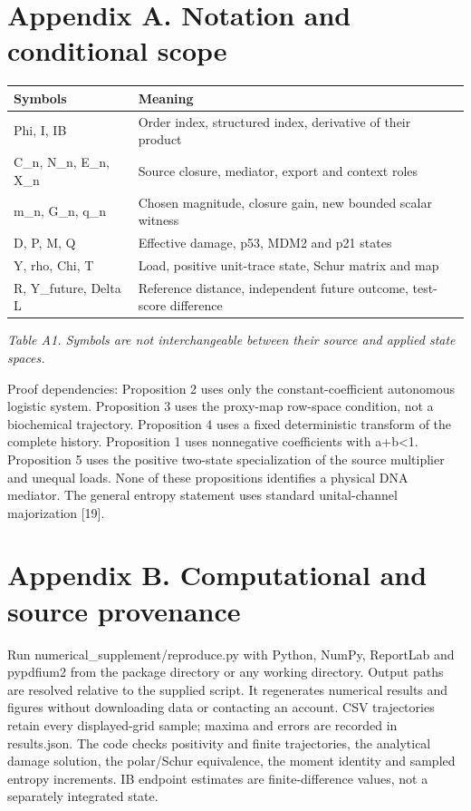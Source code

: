 \documentclass[11pt,a4paper]{article}
\begin{document}
\section*{Appendix A. Notation and conditional scope}
\begin{longtable}{p{7.9cm}|p{7.9cm}}
Symbols & Meaning\\\hline
Phi, I, IB & Order index, structured index, derivative of their product\\\hline
C\_n, N\_n, E\_n, X\_n & Source closure, mediator, export and context roles\\\hline
m\_n, G\_n, q\_n & Chosen magnitude, closure gain, new bounded scalar witness\\\hline
D, P, M, Q & Effective damage, p53, MDM2 and p21 states\\\hline
Y, rho, Chi, T & Load, positive unit-trace state, Schur matrix and map\\\hline
R, Y\_future, Delta L & Reference distance, independent future outcome, test-score difference\\\hline
\end{longtable}{\small\itshape Table A1. Symbols are not interchangeable between their source and applied state spaces.\par}
Proof dependencies: Proposition 2 uses only the constant-coefficient autonomous logistic system. Proposition 3 uses the proxy-map row-space condition, not a biochemical trajectory. Proposition 4 uses a fixed deterministic transform of the complete history. Proposition 1 uses nonnegative coefficients with a+b<1. Proposition 5 uses the positive two-state specialization of the source multiplier and unequal loads. None of these propositions identifies a physical DNA mediator. The general entropy statement uses standard unital-channel majorization [19].

\section*{Appendix B. Computational and source provenance}
Run numerical\_supplement/reproduce.py with Python, NumPy, ReportLab and pypdfium2 from the package directory or any working directory. Output paths are resolved relative to the supplied script. It regenerates numerical results and figures without downloading data or contacting an account. CSV trajectories retain every displayed-grid sample; maxima and errors are recorded in results.json. The code checks positivity and finite trajectories, the analytical damage solution, the polar/Schur equivalence, the moment identity and sampled entropy increments. IB endpoint estimates are finite-difference values, not a separately integrated state.
\end{document}

